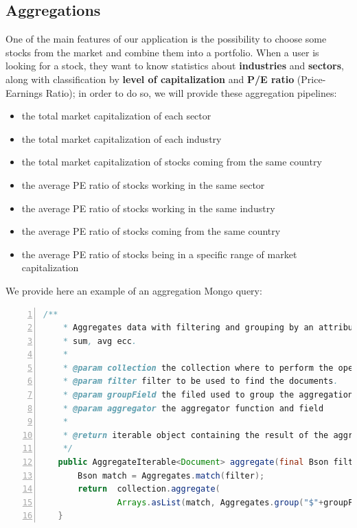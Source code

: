 \subsection{Aggregations}
One of the main features of our application is the possibility to choose some
stocks from the market and combine them into a portfolio. When a user is looking
for a stock, they want to know statistics about \textbf{industries} and
\textbf{sectors}, along with classification by \textbf{level of capitalization}
and \textbf{P/E ratio} (Price-Earnings Ratio); in order to do so, we will
provide these aggregation pipelines:
\begin{itemize}
    \item the total market capitalization of each sector
    \item the total market capitalization of each industry
    \item the total market capitalization of stocks coming from the same country
    \item the average PE ratio of stocks working in the same sector
    \item the average PE ratio of stocks working in the same industry
    \item the average PE ratio of stocks coming from the same country
    \item the average PE ratio of stocks being in a specific range of market capitalization
\end{itemize}
We provide here an example of an aggregation Mongo query:
\begin{lstlisting}[basicstyle=\footnotesize,language=Java,numbers=left,
    numberstyle=\footnotesize,numbersep=4pt,frame=single]
    /**
    * Aggregates data with filtering and grouping by an attribute, can compute
    * sum, avg ecc.
    *
    * @param collection the collection where to perform the operation;
    * @param filter filter to be used to find the documents.
    * @param groupField the filed used to group the aggregation
    * @param aggregator the aggregator function and field
    *
    * @return iterable object containing the result of the aggregation.
    */
   public AggregateIterable<Document> aggregate(final Bson filter, final String groupField, final BsonField aggregator, final MongoCollection<Document> collection) {
       Bson match = Aggregates.match(filter);
       return  collection.aggregate(
               Arrays.asList(match, Aggregates.group("$"+groupField, aggregator)));
   }
\end{lstlisting}
